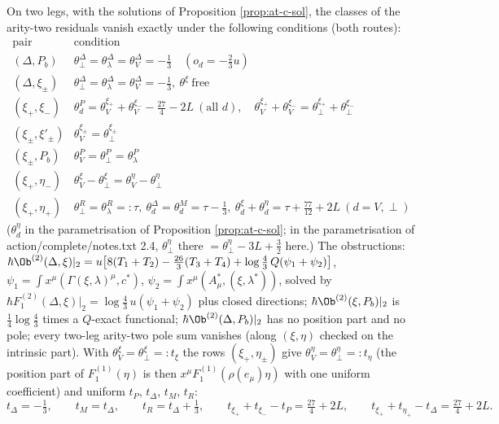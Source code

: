 \begin{proposition}
\label{prop:at-c-ar2}
On two legs, with the solutions of Proposition \ref{prop:at-c-sol}, the classes of the arity-two residuals vanish exactly under the following conditions (both routes):
\[
\begin{array}{l|l}
\text{pair} & \text{condition}\\
\hline
(\Delta,P_b) & \theta^\Delta_\perp=\theta^\Delta_\lambda=\theta^\Delta_V=-\tfrac13\quad(o_d=-\tfrac23u)\\
(\Delta,\xi_\pm) & \theta^\Delta_\perp=\theta^\Delta_\lambda=\theta^\Delta_V=-\tfrac13,\ \theta^\xi\ \text{free}\\
(\xi_+,\xi_-) & \theta^P_d=\theta^{\xi_+}_V+\theta^{\xi_-}_V-\tfrac{27}4-2L\ (\text{all }d),\quad \theta^{\xi_+}_V+\theta^{\xi_-}_V=\theta^{\xi_+}_\perp+\theta^{\xi_-}_\perp\\
(\xi_\pm,\xi'_\pm) & \theta^{\xi_\pm}_V=\theta^{\xi_\pm}_\perp\\
(\xi_\pm,P_b) & \theta^P_V=\theta^P_\perp=\theta^P_\lambda\\
(\xi_+,\eta_-) & \theta^\xi_V-\theta^\xi_\perp=\theta^\eta_V-\theta^\eta_\perp\\
(\xi_+,\eta_+) & \theta^R_\perp=\theta^R_\lambda=:\tau,\ \theta^\Delta_d=\theta^M_d=\tau-\tfrac13,\ \theta^\xi_d+\theta^\eta_d=\tau+\tfrac{77}{12}+2L\ (d=V,\perp)
\end{array}
\]
($\theta^\eta_d$ in the parametrisation of Proposition \ref{prop:at-c-sol}; in the parametrisation of action/complete/notes.txt 2.4, $\theta^\eta_\perp$ there $=\theta^\eta_\perp-3L+\tfrac32$ here.)
The obstructions: $\hbar\Ob^{(2)}(\Delta,\xi)|_2=u\big[8(T_1+T_2)-\tfrac{26}3(T_3+T_4)+\log\tfrac43\,Q(\psi_1+\psi_2)\big]$, $\psi_1=\int x^\mu(\Gamma(\xi,\lambda)^\mu,c^*)$, $\psi_2=\int x^\mu(A^*_\mu,(\xi,\lambda^*))$, solved by $\hbar F_1^{(2)}(\Delta,\xi)|_2=\log\tfrac43\,u(\psi_1+\psi_2)$ plus closed directions; $\hbar\Ob^{(2)}(\xi,P_b)|_2$ is $\tfrac14\log\tfrac43$ times a $Q$-exact functional; $\hbar\Ob^{(2)}(\Delta,P_b)|_2$ has no position part and no pole; every two-leg arity-two pole sum vanishes (along $(\xi,\eta)$ checked on the intrinsic part). With $\theta^\xi_V=\theta^\xi_\perp=:t_\xi$ the rows $(\xi_+,\eta_\pm)$ give $\theta^\eta_V=\theta^\eta_\perp=:t_\eta$ (the position part of $F_1^{(1)}(\eta)$ is then $x^\mu F_1^{(1)}(\rho(e_\mu)\eta)$ with one uniform coefficient) and uniform $t_P$, $t_\Delta$, $t_M$, $t_R$:
\[
t_\Delta=-\tfrac13,\qquad t_M=t_\Delta,\qquad t_R=t_\Delta+\tfrac13,\qquad t_{\xi_+}+t_{\xi_-}-t_P=\tfrac{27}4+2L,\qquad t_{\xi_+}+t_{\eta_+}-t_\Delta=\tfrac{27}4+2L .
\]
\end{proposition}

